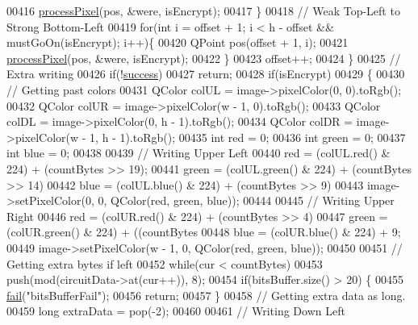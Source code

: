 \begin{DoxyCode}
00416             \hyperlink{class_model_p_c_a1171f9fe1550133dc9053a46b4e5bcfd}{processPixel}(pos, &were, isEncrypt);
00417         \}
00418         \textcolor{comment}{// Weak Top-Left to Strong Bottom-Left}
00419         \textcolor{keywordflow}{for}(\textcolor{keywordtype}{int} i = offset + 1; i < h - offset && mustGoOn(isEncrypt); i++)\{
00420             QPoint pos(offset + 1, i);
00421             \hyperlink{class_model_p_c_a1171f9fe1550133dc9053a46b4e5bcfd}{processPixel}(pos, &were, isEncrypt);
00422         \}
00423         offset++;
00424     \}
00425     \textcolor{comment}{// Extra writing}
00426     \textcolor{keywordflow}{if}(!\hyperlink{class_model_p_c_a945ffbbc44a832b953c191debd448f4c}{success})
00427         \textcolor{keywordflow}{return};
00428     \textcolor{keywordflow}{if}(isEncrypt)
00429     \{
00430         \textcolor{comment}{// Getting past colors}
00431         QColor colUL = image->pixelColor(0, 0).toRgb();
00432         QColor colUR = image->pixelColor(w - 1, 0).toRgb();
00433         QColor colDL = image->pixelColor(0, h - 1).toRgb();
00434         QColor colDR = image->pixelColor(w - 1, h - 1).toRgb();
00435         \textcolor{keywordtype}{int} red = 0;
00436         \textcolor{keywordtype}{int} green = 0;
00437         \textcolor{keywordtype}{int} blue = 0;
00438 
00439         \textcolor{comment}{// Writing Upper Left}
00440         red = (colUL.red() & 224) + (countBytes >> 19);
00441         green = (colUL.green() & 224) + (countBytes >> 14) %
00442         blue = (colUL.blue() & 224) + (countBytes >> 9) %
00443         image->setPixelColor(0, 0, QColor(red, green, blue));
00444 
00445         \textcolor{comment}{// Writing Upper Right}
00446         red = (colUR.red() & 224) + (countBytes >> 4) %
00447         green = (colUR.green() & 224) + ((countBytes %
00448         blue = (colUR.blue() & 224) + 9;
00449         image->setPixelColor(w - 1, 0, QColor(red, green, blue));
00450 
00451         \textcolor{comment}{// Getting extra bytes if left}
00452         \textcolor{keywordflow}{while}(cur < countBytes)
00453             push(mod(circuitData->at(cur++)), 8);
00454         \textcolor{keywordflow}{if}(bitsBuffer.size() > 20) \{
00455             \hyperlink{class_model_p_c_a47464b59b7e37fcee25e55475708aabd}{fail}(\textcolor{stringliteral}{"bitsBufferFail"});
00456             \textcolor{keywordflow}{return};
00457         \}
00458         \textcolor{comment}{// Getting extra data as long.}
00459         \textcolor{keywordtype}{long} extraData = pop(-2);
00460 
00461         \textcolor{comment}{// Writing Down Left}

\end{DoxyCode}

